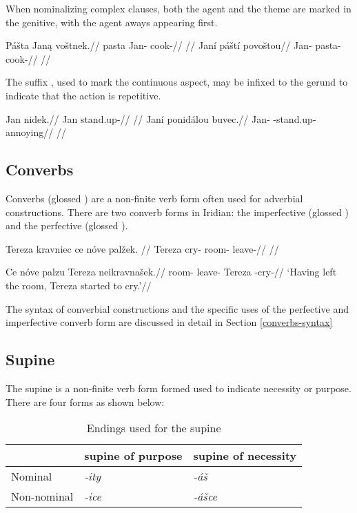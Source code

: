 When nominalizing complex clauses, both the agent and the theme are marked in the genitive, with the agent aways appearing first.

\pex
\a
\begingl
\gla P\'a\v{s}ta Jan\k{a} vo\v{s}tnek.//
\glb pasta Jan- cook-//
\glft {}//
\endgl
\a
\begingl
\gla Jan\'i p\'a\v{s}t\'i povo\v{s}tou//
\glb Jan- pasta- cook-//
\glft {}//
\endgl
\xe

The suffix , used to mark the continuous aspect, may be infixed to the gerund to indicate that the action is repetitive.

\pex
\a
\begingl
\gla Jan nidek.//
\glb Jan stand.up-//
\glft {}//
\endgl
\a
\begingl
\gla Jan\'i ponid\'alou buvec.//
\glb Jan- -stand.up- annoying//
\glft {}//
\endgl
\xe

\subsection{Converbs}
Converbs (glossed ) are a non-finite verb form often used for adverbial constructions. There are two converb forms in Iridian: the imperfective  (glossed ) and the perfective  (glossed ).

\pex
\begingl
\gla Tereza kravniec ce nóve pal\v{z}ek. //
\glb Tereza cry-  room- leave-//
\glft {}//
\endgl
\xe

\pex
\begingl
\gla Ce nóve palzu Tereza neikravna\v{s}ek.//
\glb {} room- leave- Tereza -cry-//
\glft `Having left the room, Tereza started to cry.'//
\endgl
\xe

The syntax of converbial constructions and the specific uses of the perfective and imperfective converb form are discussed in detail in Section \ref{converbs-syntax}


\subsection{Supine}
The supine is a non-finite verb form formed used to indicate necessity or purpose. There are four forms as shown below:

\begin{table}[h!]
	\centering\small
	\caption{Endings used for the supine}
	\begin{tabularx}{0.8\textwidth}{MMM}
		\toprule
		&{\sc supine of purpose}&{\sc supine of necessity}\\
		\midrule
		Nominal & \textit{-ity} & \textit{-á\v{s}}\\
		\addlinespace
		Non-nominal & \textit{-ice} & \textit{-á\v{s}ce}\\
		\bottomrule
	\end{tabularx}
\end{table}


